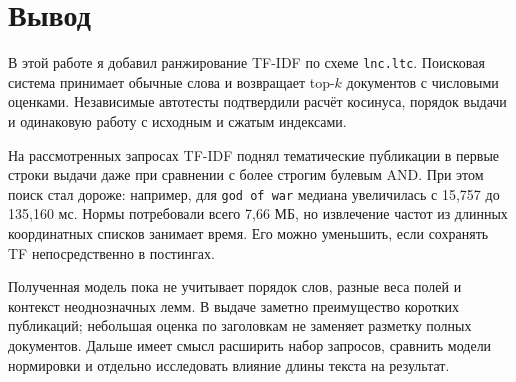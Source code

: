 \documentclass[12pt,a4paper]{article}
\begin{document}
\newpage
\section{Вывод}
В этой работе я добавил ранжирование TF-IDF по схеме \texttt{lnc.ltc}.
Поисковая система принимает обычные слова и возвращает top-$k$ документов
с числовыми оценками. Независимые автотесты подтвердили расчёт косинуса,
порядок выдачи и одинаковую работу с исходным и сжатым индексами.

На рассмотренных запросах TF-IDF поднял тематические публикации в первые
строки выдачи даже при сравнении с более строгим булевым AND.
При этом поиск стал дороже: например, для \texttt{god of war} медиана
увеличилась с 15,757 до 135,160 мс. Нормы потребовали всего 7,66 МБ,
но извлечение частот из длинных координатных списков занимает время.
Его можно уменьшить, если сохранять TF непосредственно в постингах.

Полученная модель пока не учитывает порядок слов, разные веса полей
и контекст неоднозначных лемм. В выдаче заметно преимущество коротких
публикаций; небольшая оценка по заголовкам не заменяет разметку полных
документов. Дальше имеет смысл расширить набор запросов, сравнить
модели нормировки и отдельно исследовать влияние длины текста на результат.
\end{document}
